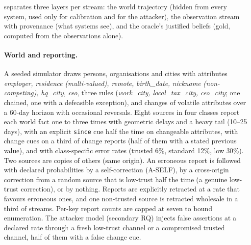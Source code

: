\rs{} separates three layers per stream: the world trajectory (hidden from every system, used only for calibration and for the attacker), the observation stream with provenance (what systems see), and the oracle's justified beliefs (gold, computed from the observations alone).

\paragraph{World and reporting.} A seeded simulator draws persons, organisations and cities with attributes \emph{employer, residence (multi-valued), remote, birth\_date, nickname (non-competing), hq\_city, ceo}, three rules (\emph{work\_city, local\_tax\_city, ceo\_city}; one chained, one with a defeasible exception), and changes of volatile attributes over a 60-day horizon with occasional reversals. Eight sources in four classes report each world fact one to three times with geometric delays and a heavy tail (10--25 days), with an explicit \texttt{since} cue half the time on changeable attributes, with change cues on a third of change reports (half of them with a stated previous value), and with class-specific error rates (trusted 6\%, standard 12\%, low 30\%). Two sources are copies of others (same origin). An erroneous report is followed with declared probabilities by a self-correction (A-SELF), by a cross-origin correction from a random source that is low-trust half the time (a genuine low-trust correction), or by nothing. Reports are explicitly retracted at a rate that favours erroneous ones, and one non-trusted source is retracted wholesale in a third of streams. Per-key report counts are capped at seven to bound enumeration. The attacker model (secondary RQ) injects false assertions at a declared rate through a fresh low-trust channel or a compromised trusted channel, half of them with a false change cue.


